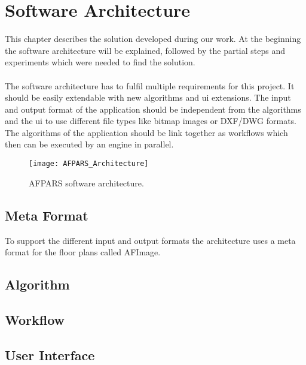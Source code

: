 \section{Software Architecture}
This chapter describes the solution developed during our work. At the beginning the software architecture will be explained, followed by the partial steps and experiments which were needed to find the solution.
\\\\
The software architecture has to fulfil multiple requirements for this project. It should be easily extendable with new algorithms and ui extensions. The input and output format of the application should be independent from the algorithms and the ui to use different file types like bitmap images or \Gls{DXF}/\Gls{DWG} formats. The algorithms of the application should be link together as workflows which then can be executed by an engine in parallel.

\begin{figure}
  \centering
      \texttt{[image: AFPARS\_Architecture]}
  \caption{AFPARS software architecture.}
\end{figure}


\subsection{Meta Format}
To support the different input and output formats the architecture uses a meta format for the
floor plans called AFImage.
\subsection{Algorithm}
\subsection{Workflow}

\subsection{User Interface}

